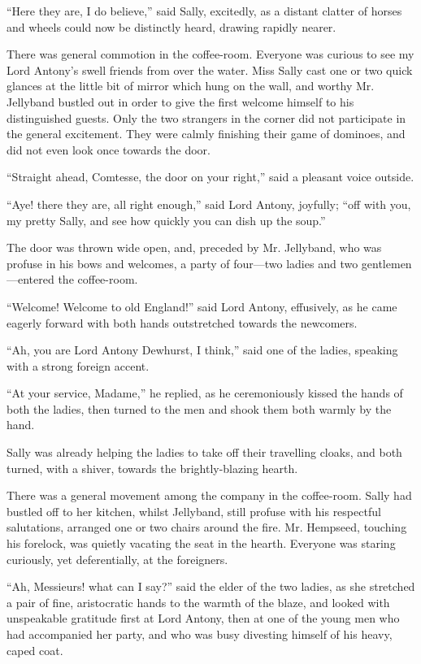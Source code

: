\documentclass[paper=5.5in:8.5in,BCOR=7mm,twoside,DIV=calc,12pt,usegeometry,chapterprefix,endperiod,headings=big]{scrbook}
\begin{document}
\enquote{Here they are, I do believe,} said Sally, excitedly, as a distant clatter of horses and wheels could now be distinctly heard, drawing rapidly nearer.

There was general commotion in the coffee-room. Everyone was curious to see my Lord Antony's swell friends from over the water. Miss Sally cast one or two quick glances at the little bit of mirror which hung on the wall, and worthy Mr. Jellyband bustled out in order to give the first welcome himself to his distinguished guests. Only the two strangers in the corner did not participate in the general excitement. They were calmly finishing their game of dominoes, and did not even look once towards the door.

\enquote{Straight ahead, Comtesse, the door on your right,} said a pleasant voice outside.

\enquote{Aye! there they are, all right enough,} said Lord Antony, joyfully; \enquote{off with you, my pretty Sally, and see how quickly you can dish up the soup.}

The door was thrown wide open, and, preceded by Mr. Jellyband, who was profuse in his bows and welcomes, a party of four---two ladies and two gentlemen---entered the coffee-room.

\enquote{Welcome! Welcome to old England!} said Lord Antony, effusively, as he came eagerly forward with both hands outstretched towards the newcomers.

\enquote{Ah, you are Lord Antony Dewhurst, I think,} said one of the ladies, speaking with a strong foreign accent.

\enquote{At your service, Madame,} he replied, as he ceremoniously kissed the hands of both the ladies, then turned to the men and shook them both warmly by the hand.

Sally was already helping the ladies to take off their travelling cloaks, and both turned, with a shiver, towards the brightly-blazing hearth.

There was a general movement among the company in the coffee-room. Sally had bustled off to her kitchen, whilst Jellyband, still profuse with his respectful salutations, arranged one or two chairs around the fire. Mr. Hempseed, touching his forelock, was quietly vacating the seat in the hearth. Everyone was staring curiously, yet deferentially, at the foreigners.

\enquote{Ah, Messieurs! what can I say?} said the elder of the two ladies, as she stretched a pair of fine, aristocratic hands to the warmth of the blaze, and looked with unspeakable gratitude first at Lord Antony, then at one of the young men who had accompanied her party, and who was busy divesting himself of his heavy, caped coat.
\end{document}
